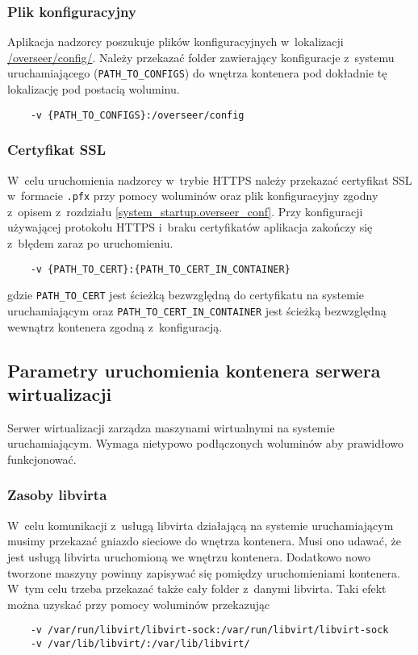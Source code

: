 \documentclass[../opis-rozwiazania.tex]{subfiles}
\begin{document}
\subsubsection{Plik konfiguracyjny}
Aplikacja nadzorcy poszukuje plików konfiguracyjnych w~lokalizacji \url{/overseer/config/}.
Należy przekazać folder zawierający konfiguracje z~systemu uruchamiającego (\texttt{PATH\_TO\_CONFIGS}) do wnętrza kontenera pod dokładnie tę lokalizację pod postacią woluminu.
\begin{verbatim}
	-v {PATH_TO_CONFIGS}:/overseer/config
\end{verbatim}

\subsubsection{Certyfikat SSL}
W~celu uruchomienia nadzorcy w~trybie HTTPS należy przekazać certyfikat SSL w~formacie \texttt{.pfx} przy pomocy woluminów oraz plik konfiguracyjny zgodny z~opisem z~rozdziału \ref{system_startup.overseer_conf}.
Przy konfiguracji używającej protokołu HTTPS i~braku certyfikatów aplikacja zakończy się z~błędem zaraz po uruchomieniu.

\begin{verbatim}
	-v {PATH_TO_CERT}:{PATH_TO_CERT_IN_CONTAINER}
\end{verbatim}
gdzie \texttt{PATH\_TO\_CERT} jest ścieżką bezwzględną do certyfikatu na systemie uruchamiającym oraz \texttt{PATH\_TO\_CERT\_IN\_CONTAINER} jest ścieżką bezwzględną wewnątrz kontenera zgodną z~konfiguracją.

\subsection{Parametry uruchomienia kontenera serwera wirtualizacji}
Serwer wirtualizacji zarządza maszynami wirtualnymi na systemie uruchamiającym.
Wymaga nietypowo podłączonych woluminów aby prawidłowo funkcjonować.

\subsubsection{Zasoby libvirta}
W~celu komunikacji z~usługą libvirta działającą na systemie uruchamiającym musimy przekazać gniazdo sieciowe do wnętrza kontenera.
Musi ono udawać, że jest usługą libvirta uruchomioną we wnętrzu kontenera.
Dodatkowo nowo tworzone maszyny powinny zapisywać się pomiędzy uruchomieniami kontenera.
W~tym celu trzeba przekazać także cały folder z~danymi libvirta.
Taki efekt można uzyskać przy pomocy woluminów przekazując
\begin{verbatim}
	-v /var/run/libvirt/libvirt-sock:/var/run/libvirt/libvirt-sock
	-v /var/lib/libvirt/:/var/lib/libvirt/
\end{verbatim}
\end{document}
